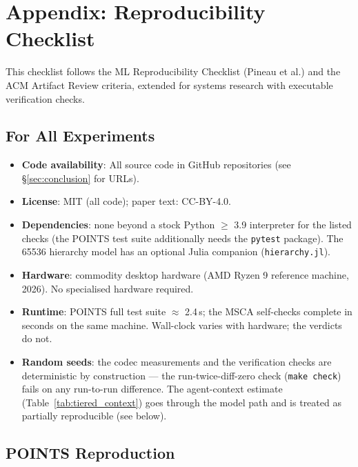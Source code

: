 
\section*{Appendix: Reproducibility Checklist}

This checklist follows the ML Reproducibility Checklist (Pineau et al.) and the ACM Artifact Review criteria, extended for systems research with executable verification checks.

\subsection*{For All Experiments}

\begin{itemize}
\item \textbf{Code availability}: All source code in GitHub repositories (see §\ref{sec:conclusion} for URLs).
\item \textbf{License}: MIT (all code); paper text: CC-BY-4.0.
\item \textbf{Dependencies}: none beyond a stock Python $\ge$ 3.9 interpreter for the listed checks (the POINTS test suite additionally needs the \texttt{pytest} package). The 65536 hierarchy model has an optional Julia companion (\texttt{hierarchy.jl}).
\item \textbf{Hardware}: commodity desktop hardware (AMD Ryzen 9 reference machine, 2026). No specialised hardware required.
\item \textbf{Runtime}: POINTS full test suite $\approx$ 2.4\,s; the MSCA self-checks complete in seconds on the same machine. Wall-clock varies with hardware; the verdicts do not.
\item \textbf{Random seeds}: the codec measurements and the verification checks are deterministic by construction --- the run-twice-diff-zero check (\texttt{make check}) fails on any run-to-run difference. The agent-context estimate (Table~\ref{tab:tiered_context}) goes through the model path and is treated as partially reproducible (see below).
\end{itemize}

\subsection*{POINTS Reproduction}

